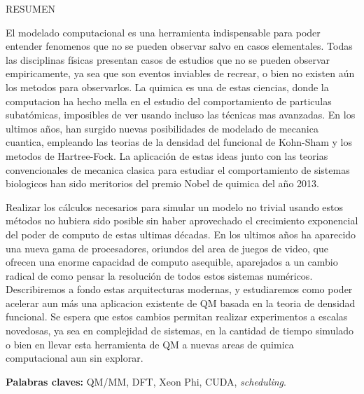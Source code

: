 \begin{center}
\large \textsc{RESUMEN}
\end{center}
\vspace{1cm}

\noindent

El modelado computacional es una herramienta indispensable para poder entender
fenomenos que no se pueden observar salvo en casos elementales. Todas las disciplinas
f\'isicas presentan casos de estudios que no se pueden observar empiricamente, ya
sea que son eventos inviables de recrear, o bien no existen a\'un los metodos para
observarlos. La quimica es una de estas ciencias, donde la computacion ha hecho mella
en el estudio del comportamiento de particulas subat\'omicas, imposibles de ver usando
incluso las t\'ecnicas mas avanzadas. En los ultimos a\~nos, han surgido nuevas posibilidades
de modelado de mecanica cuantica, empleando las teorias de la densidad del funcional de Kohn-Sham
y los metodos de Hartree-Fock. La aplicaci\'on de estas ideas junto con las teorias convencionales
de mecanica clasica para estudiar el comportamiento de sistemas biologicos han sido meritorios
del premio Nobel de quimica del a\~no 2013.

Realizar los c\'alculos necesarios para simular un modelo no trivial usando estos m\'etodos
no hubiera sido posible sin haber aprovechado el crecimiento exponencial del poder de
computo de estas ultimas d\'ecadas. En los ultimos a\~nos ha aparecido una nueva gama de
procesadores, oriundos del area de juegos de video, que ofrecen una enorme capacidad de
computo asequible, aparejados a un cambio radical de como pensar la resoluci\'on de
todos estos sistemas num\'ericos. Describiremos a fondo estas arquitecturas modernas,
y estudiaremos como poder acelerar aun m\'as una aplicacion existente de QM basada en
la teoria de densidad funcional. Se espera que estos cambios permitan realizar experimentos
a escalas novedosas, ya sea en complejidad de sistemas, en la cantidad de tiempo simulado o
bien en llevar esta herramienta de QM a nuevas areas de quimica computacional aun sin explorar.


\bigskip

\noindent\textbf{Palabras claves:} QM/MM, DFT, Xeon Phi, CUDA, \textit{scheduling}.
